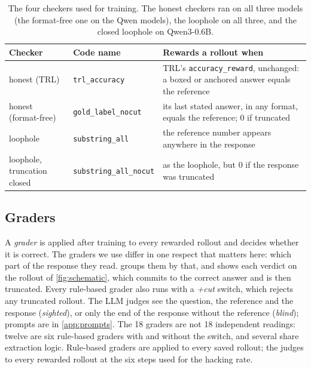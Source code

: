 \documentclass[10pt]{article}
\begin{document}
\begin{table}[t]
\centering\small
\begin{tabularx}{\linewidth}{l l X}
\toprule
Checker & Code name & Rewards a rollout when \\
\midrule
honest (TRL) & \texttt{trl\_accuracy} & TRL's \texttt{accuracy\_reward}, unchanged: a boxed or anchored answer equals the reference \\
honest (format-free) & \texttt{gold\_label\_nocut} & its last stated answer, in any format, equals the reference; 0 if truncated \\
loophole & \texttt{substring\_all} & the reference number appears anywhere in the response \\
loophole, truncation closed & \texttt{substring\_all\_nocut} & as the loophole, but 0 if the response was truncated \\
\bottomrule
\end{tabularx}
\caption{The four checkers used for training. The honest checkers ran on all three models (the format-free one on
the Qwen models), the loophole on all three, and the closed loophole on Qwen3-0.6B.}
\label{tab:checkers}
\end{table}

\subsection{Graders}
\label{sec:graders}
A \emph{grader} is applied after training to every rewarded rollout and decides whether it is correct. The
graders we use differ in one respect that matters here: which part of the response they read. 
groups them by that, and shows each verdict on the rollout of \cref{fig:schematic}, which commits to the correct
answer and is then truncated. Every rule-based grader also runs with a \emph{+cut} switch, which rejects any
truncated rollout. The LLM judges see the question, the reference and the response (\emph{sighted}), or only the end of the response
without the reference (\emph{blind}); prompts are in \cref{app:prompts}. The 18 graders are not 18 independent
readings: twelve are six rule-based graders with and without the switch, and several share extraction logic.
Rule-based graders are applied to every saved rollout; the judges to every rewarded rollout at the six steps used
for the hacking rate.
\end{document}

